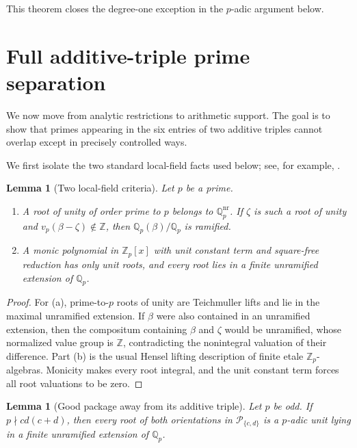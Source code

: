 \documentclass[11pt]{article}
\newtheorem{lemma}[theorem]{Lemma}
\theoremstyle{definition}
\newcommand{\Q}{\mathbb Q}
\newcommand{\Z}{\mathbb Z}
\newcommand{\Package}{\mathcal P}
\begin{document}
This theorem closes the degree-one exception in the \(p\)-adic argument below.

\section{Full additive-triple prime separation}

We now move from analytic restrictions to arithmetic support.  The goal is to show that primes appearing in the six entries of two additive triples cannot overlap except in precisely controlled ways.
\label{sec:padic}

We first isolate the two standard local-field facts used below; see, for
example, \cite[Chapters~I--II]{SerreLocalFields}.

\begin{lemma}[Two local-field criteria]\label{lem:localcriteria}
Let \(p\) be a prime.
\begin{enumerate}[label=(\alph*)]
\item A root of unity of order prime to \(p\) belongs to
\(\Q_p^{\mathrm{nr}}\).  If \(\zeta\) is such a root of unity and
\(v_p(\beta-\zeta)\notin\Z\), then \(\Q_p(\beta)/\Q_p\) is ramified.
\item A monic polynomial in \(\Z_p[x]\) with unit constant term and
square-free reduction has only unit roots, and every root lies in a finite
unramified extension of \(\Q_p\).
\end{enumerate}
\end{lemma}

\begin{proof}
For (a), prime-to-\(p\) roots of unity are Teichmuller lifts and lie in the
maximal unramified extension.  If \(\beta\) were also contained in an
unramified extension, then the compositum containing \(\beta\) and \(\zeta\)
would be unramified, whose normalized value group is \(\Z\), contradicting
the nonintegral valuation of their difference.  Part (b) is the usual Hensel
lifting description of finite etale \(\Z_p\)-algebras.  Monicity makes every
root integral, and the unit constant term forces all root valuations to be
zero.
\end{proof}

\begin{lemma}[Good package away from its additive triple]
\label{lem:goodpackage}
Let \(p\) be odd.  If \(p\nmid cd(c+d)\), then every root of both
orientations in \(\Package_{\{c,d\}}\) is a \(p\)-adic unit lying in a
finite unramified extension of \(\Q_p\).
\end{lemma}
\end{document}
